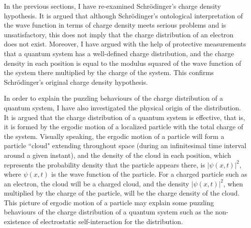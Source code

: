 In the previous sections, I have re-examined Schr\"{o}dinger's charge density hypothesis. 
It is argued that although Schr\"{o}dinger's ontological interpretation of the wave function in terms of charge density meets serious problems and is unsatisfactory, this does not imply that the charge distribution of an electron does not exist. 
Moreover, I have argued with the help of protective measurements that a quantum system has a well-defined charge distribution, and the charge density in each position is equal to the modulus squared of the wave function of the system there multiplied by the charge of the system.
This confirms Schr\"{o}dinger's original charge density hypothesis. 

In order to explain the puzzling behaviours of the charge distribution of a quantum system, I have also investigated the physical origin of the distribution.
It is argued that the charge distribution of a quantum system is effective, that is, it is formed by the ergodic motion of a localized particle with the total charge of the system. 
Visually speaking, the ergodic motion of a particle will form a particle ``cloud" extending throughout space (during an infinitesimal time interval around a given instant), and the density of the cloud in each position, which represents the probability density that the particle appears there, is $|\psi(x,t)|^2$, where $\psi(x,t)$ is the wave function of the particle. For a charged particle such as an electron, the cloud will be a charged cloud, and the density $|\psi(x,t)|^2$, when multiplied by the charge of the particle, will be the charge density of the cloud. This picture of ergodic motion of a particle may explain some puzzling behaviours of the charge distribution of a quantum system such as the non-existence of electrostatic self-interaction for the distribution.


